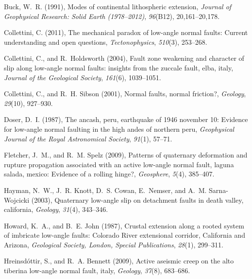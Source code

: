 \documentclass[twocolumn,grl]{AGUTeX}
\begin{document}
\begin{article}
\begin{thebibliography}{23}
Buck, W.~R. (1991), Modes of continental lithospheric extension,
  \textit{Journal of Geophysical Research: Solid Earth (1978--2012)},
  \textit{96}(B12), 20,161--20,178.

Collettini, C. (2011), The mechanical paradox of low-angle normal faults:
  Current understanding and open questions, \textit{Tectonophysics},
  \textit{510}(3), 253--268.

Collettini, C., and R.~Holdsworth (2004), Fault zone weakening and character of
  slip along low-angle normal faults: insights from the zuccale fault, elba,
  italy, \textit{Journal of the Geological Society}, \textit{161}(6),
  1039--1051.

Collettini, C., and R.~H. Sibson (2001), Normal faults, normal friction?,
  \textit{Geology}, \textit{29}(10), 927--930.

Doser, D.~I. (1987), The ancash, peru, earthquake of 1946 november 10: Evidence
  for low-angle normal faulting in the high andes of northern peru,
  \textit{Geophysical Journal of the Royal Astronomical Society},
  \textit{91}(1), 57--71.

Fletcher, J.~M., and R.~M. Spelz (2009), Patterns of quaternary deformation and
  rupture propagation associated with an active low-angle normal fault, laguna
  salada, mexico: Evidence of a rolling hinge?, \textit{Geosphere},
  \textit{5}(4), 385--407.

Hayman, N.~W., J.~R. Knott, D.~S. Cowan, E.~Nemser, and A.~M. Sarna-Wojcicki
  (2003), Quaternary low-angle slip on detachment faults in death valley,
  california, \textit{Geology}, \textit{31}(4), 343--346.

Howard, K.~A., and B.~E. John (1987), Crustal extension along a rooted system
  of imbricate low-angle faults: {Colorado River} extensional corridor,
  {California} and {Arizona}, \textit{Geological Society, London, Special
  Publications}, \textit{28}(1), 299--311.

Hreinsd{\'o}ttir, S., and R.~A. Bennett (2009), Active aseismic creep on the
  alto tiberina low-angle normal fault, italy, \textit{Geology},
  \textit{37}(8), 683--686.


\end{thebibliography}
\end{article}
\end{document}
